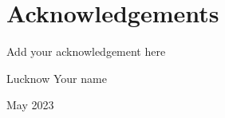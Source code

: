 \chapter*{Acknowledgements}


Add your acknowledgement here

\vspace{3cm}

\noindent Lucknow \hfill Your name

\noindent May 2023


